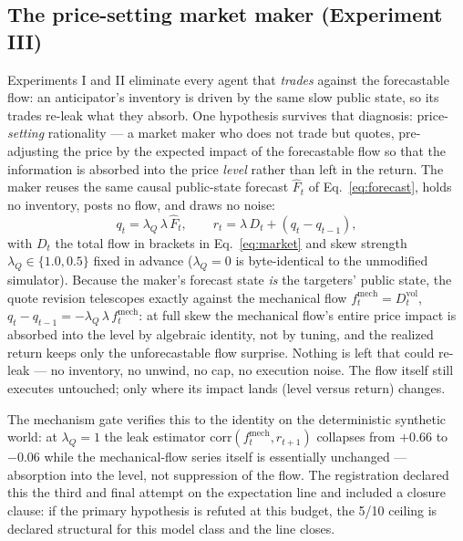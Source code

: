 \documentclass[11pt]{article}
\begin{document}
\subsection{The price-setting market maker (Experiment III)}
\label{sec:model:maker}

Experiments I and II eliminate every agent that \emph{trades} against the
forecastable flow: an anticipator's inventory is driven by the same slow
public
state, so its trades re-leak what they absorb. One hypothesis survives that
diagnosis: price-\emph{setting} rationality --- a market maker who does not
trade but quotes, pre-adjusting the price by the expected impact of the
forecastable flow so that the information is absorbed into the price
\emph{level} rather than left in the return. The maker reuses the same causal
public-state forecast $\hat F_t$ of Eq.~\eqref{eq:forecast}, holds no
inventory, posts no flow, and draws no noise:
%
\begin{equation}
q_t = \lambda_Q\,\lambda\,\hat F_t, \qquad
r_t = \lambda\,D_t + (q_t - q_{t-1}),
\label{eq:maker}
\end{equation}
%
with $D_t$ the total flow in brackets in Eq.~\eqref{eq:market} and skew
strength $\lambda_Q \in \{1.0, 0.5\}$ fixed in advance
($\lambda_Q = 0$ is byte-identical to the unmodified simulator). Because the
maker's forecast state \emph{is} the targeters' public state, the quote
revision telescopes exactly against the mechanical flow
$f^{\mathrm{mech}}_t = D^{\mathrm{vol}}_t$,
$q_t - q_{t-1} = -\lambda_Q\,\lambda\, f^{\mathrm{mech}}_t$: at full skew the
mechanical flow's entire price impact is absorbed into the level by algebraic
identity, not by tuning, and the realized return keeps only the unforecastable
flow surprise. Nothing is left that could re-leak --- no inventory, no unwind,
no cap, no execution noise. The flow itself still executes untouched; only
where its impact lands (level versus return) changes.

The mechanism gate verifies this to the identity on the deterministic
synthetic
world: at $\lambda_Q = 1$ the leak estimator
$\mathrm{corr}(f^{\mathrm{mech}}_t, r_{t+1})$ collapses from $+0.66$ to
$-0.06$ while the mechanical-flow series itself is essentially unchanged ---
absorption into the level, not suppression of the flow. The registration
declared this the third and final attempt on the expectation line and included
a closure clause: if the primary hypothesis is refuted at this budget, the
5/10
ceiling is declared structural for this model class and the line closes.
\end{document}
